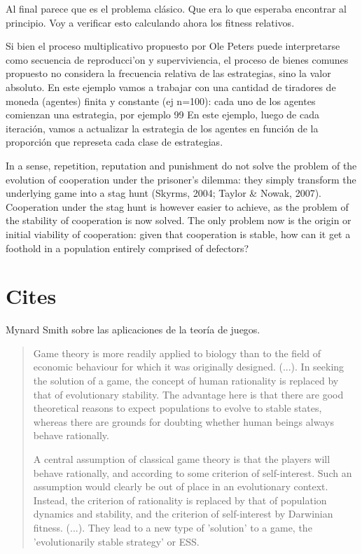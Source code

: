 \documentclass[a4paper,10pt]{article}
\begin{document}

Al final parece que es el problema clásico. Que era lo que esperaba encontrar al principio. Voy a verificar esto calculando ahora los fitness relativos.


 Si bien el proceso multiplicativo propuesto por Ole Peters puede interpretarse como secuencia de reproducci'on y superviviencia, el proceso de bienes comunes propuesto no considera la frecuencia relativa de las estrategias, sino la valor absoluto.
 En este ejemplo vamos a trabajar con una cantidad de tiradores de moneda (agentes) finita y constante (ej n=100): cada uno de los agentes comienzan una estrategia, por ejemplo 99%
 En este ejemplo, luego de cada iteración, vamos a actualizar la estrategia de los agentes en función de la proporción que represeta cada clase de estrategias.



In a sense, repetition, reputation and punishment do not solve the problem of the evolution of cooperation under the prisoner’s dilemma: they simply transform the underlying game into a stag hunt (Skyrms, 2004; Taylor \& Nowak, 2007). Cooperation under the stag hunt is however easier to achieve, as the problem of the stability of cooperation is now solved. The only problem now is the origin or initial viability of cooperation: given that cooperation is stable, how can it get a foothold in a population entirely comprised of defectors?

\section{Cites}

Mynard Smith sobre las aplicaciones de la teoría de juegos.
\begin{quotation}
    Game theory is more readily applied to biology than to the field of economic behaviour for which it was originally designed. (...).
    In seeking the solution of a game, the concept of human rationality is replaced by that of evolutionary stability.
    The advantage here is that there are good theoretical reasons to expect populations to evolve to stable states, whereas there are grounds for doubting whether human beings always behave rationally. \cite{maynardSmith1982-evolutionTheoryGames}
    
    A central assumption of classical game theory is that the players will behave rationally, and according to some criterion of self-interest.
    Such an assumption would clearly be out of place in an evolutionary context.
    Instead, the criterion of rationality is replaced by that of population dynamics and stability, and the criterion of self-interest by Darwinian fitness. (...).
    They lead to a new type of 'solution' to a game, the 'evolutionarily stable strategy' or ESS.
\end{quotation}
\end{document}
